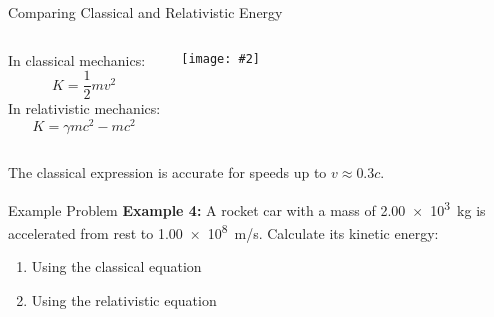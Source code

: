 \documentclass[12pt,compress,aspectratio=169]{beamer}
\newcommand{\pic}[2]{\texttt{[image: \#2]}}
\begin{document}
\begin{frame}{Comparing Classical and Relativistic Energy}
  \begin{columns}
    In classical mechanics:
    {\Large
      \begin{displaymath}
        K=\frac{1}{2} mv^2
      \end{displaymath}
    }
    In relativistic mechanics:
    {\Large
      \begin{displaymath}
        K=\gamma mc^2-mc^2
      \end{displaymath}
    }
    
    \pic{.85}{graphics/e_k.png}
  \end{columns}

  The classical expression is accurate for speeds up to $v\approx 0.3c$.
\end{frame}



\begin{frame}{Example Problem}
  \textbf{Example 4:} A rocket car with a mass of \SI{2.00e3}{kg} is accelerated
  from rest to \SI{1.00e8}{m/s}. Calculate its kinetic energy:
  \begin{enumerate}
  \item Using the classical equation
  \item Using the relativistic equation
  \end{enumerate}
\end{frame}
\end{document}
